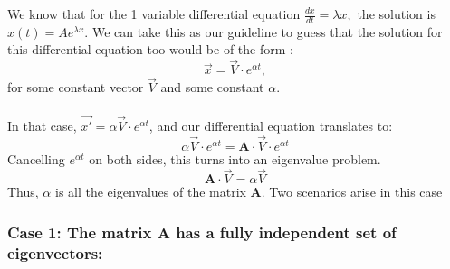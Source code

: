 \documentclass{article}
\begin{document}
We know that for the 1 variable differential equation $\frac{dx}{dt} = \lambda x,$ the solution is $x(t) = A e^{\lambda x}$. We can take this as our guideline to guess that the solution for this differential equation too would be of the form :
$$\overrightarrow{x} = \overrightarrow{V} \cdot e^{\alpha t},$$ for some constant vector $\overrightarrow{V}$ and some constant $\alpha$.
\\
\\
In that case, $\overrightarrow{x'} = \alpha \overrightarrow{V} \cdot e^{\alpha t}$, and our differential equation translates to:
$$\alpha \overrightarrow{V} \cdot e^{\alpha t} = \boldsymbol{A} \cdot \overrightarrow{V} \cdot e^{\alpha t}$$
Cancelling $e^{\alpha t}$ on both sides, this turns into an eigenvalue problem.
$$\boldsymbol{A} \cdot \overrightarrow{V} = \alpha \overrightarrow{V}$$
Thus, $\alpha$ is all the eigenvalues of the matrix $\boldsymbol{A}$. Two scenarios arise in this case

\subsubsection{Case 1: The matrix $\boldsymbol{A}$ has a fully independent set of eigenvectors:}
\end{document}
